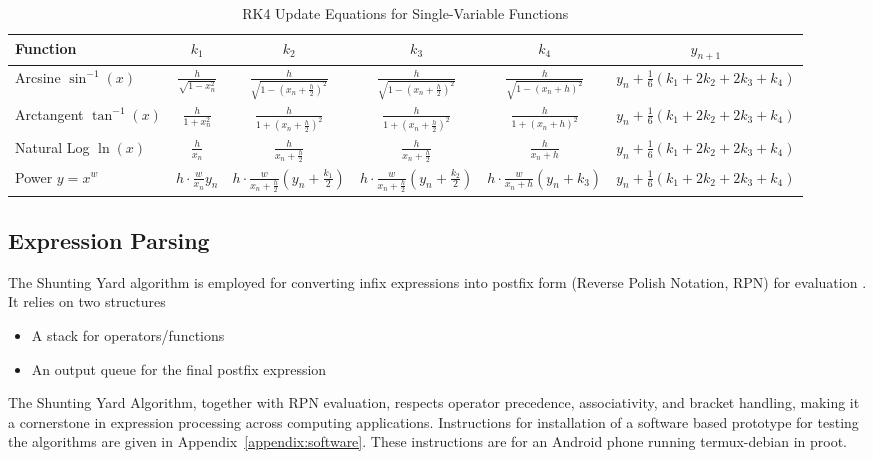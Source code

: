 \documentclass[conference]{IEEEtran}
\begin{document}
\begin{table}[htbp]
\centering
\caption{RK4 Update Equations for Single-Variable Functions}
\label{tab:rk4_single}

\renewcommand{\arraystretch}{1.4}
\setlength{\tabcolsep}{6pt}
\begin{tabular}{lccccc}
\toprule
\textbf{Function} & \textbf{$k_1$} & \textbf{$k_2$} & \textbf{$k_3$} & \textbf{$k_4$} & \textbf{$y_{n+1}$} \\
\midrule

Arcsine $\sin^{-1}(x)$ &
$\tfrac{h}{\sqrt{1-x_n^2}}$ &
$\tfrac{h}{\sqrt{1-(x_n+\tfrac{h}{2})^2}}$ &
$\tfrac{h}{\sqrt{1-(x_n+\tfrac{h}{2})^2}}$ &
$\tfrac{h}{\sqrt{1-(x_n+h)^2}}$ &
$y_n+\tfrac{1}{6}(k_1+2k_2+2k_3+k_4)$ \\

\midrule

Arctangent $\tan^{-1}(x)$ &
$\tfrac{h}{1+x_n^2}$ &
$\tfrac{h}{1+(x_n+\tfrac{h}{2})^2}$ &
$\tfrac{h}{1+(x_n+\tfrac{h}{2})^2}$ &
$\tfrac{h}{1+(x_n+h)^2}$ &
$y_n+\tfrac{1}{6}(k_1+2k_2+2k_3+k_4)$ \\

\midrule

Natural Log $\ln(x)$ &
$\tfrac{h}{x_n}$ &
$\tfrac{h}{x_n+\tfrac{h}{2}}$ &
$\tfrac{h}{x_n+\tfrac{h}{2}}$ &
$\tfrac{h}{x_n+h}$ &
$y_n+\tfrac{1}{6}(k_1+2k_2+2k_3+k_4)$ \\

\midrule

Power $y=x^w$ &
$h \cdot \tfrac{w}{x_n}y_n$ &
$h \cdot \tfrac{w}{x_n+\tfrac{h}{2}}\left(y_n+\tfrac{k_1}{2}\right)$ &
$h \cdot \tfrac{w}{x_n+\tfrac{h}{2}}\left(y_n+\tfrac{k_2}{2}\right)$ &
$h \cdot \tfrac{w}{x_n+h}\left(y_n+k_3\right)$ &
$y_n+\tfrac{1}{6}(k_1+2k_2+2k_3+k_4)$ \\

\bottomrule
\end{tabular}
\end{table}

\subsection{Expression Parsing}

The Shunting Yard algorithm is employed for converting infix expressions into postfix form (Reverse Polish Notation, RPN)  for evaluation \cite{dijkstra1961}.
It relies on two structures
\begin{itemize}
    \item A stack for operators/functions
    \item An output queue for the final postfix expression
\end{itemize}
The Shunting Yard Algorithm, together with RPN evaluation, respects operator precedence, associativity, and bracket handling, making it a cornerstone in expression processing across computing applications.
Instructions for installation of a software based prototype for testing the algorithms are given in Appendix~\ref{appendix:software}.  These instructions are for an Android phone running termux-debian in proot.
\end{document}

